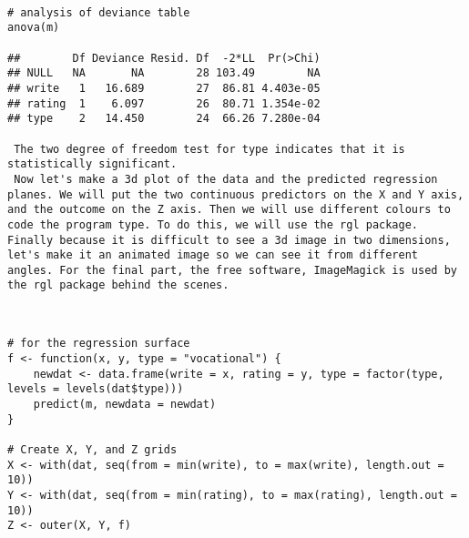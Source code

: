 \begin{frame}[fragile]
	\large
	\begin{framed}
		\begin{verbatim}

# analysis of deviance table
anova(m)

##        Df Deviance Resid. Df  -2*LL  Pr(>Chi)
## NULL   NA       NA        28 103.49        NA
## write   1   16.689        27  86.81 4.403e-05
## rating  1    6.097        26  80.71 1.354e-02
## type    2   14.450        24  66.26 7.280e-04

 The two degree of freedom test for type indicates that it is statistically significant.
 Now let's make a 3d plot of the data and the predicted regression planes. We will put the two continuous predictors on the X and Y axis, and the outcome on the Z axis. Then we will use different colours to code the program type. To do this, we will use the rgl package. Finally because it is difficult to see a 3d image in two dimensions, let's make it an animated image so we can see it from different angles. For the final part, the free software, ImageMagick is used by the rgl package behind the scenes.
 
\end{verbatim}
\end{framed}
\end{frame}
\begin{frame}[fragile]
	\large
	\begin{framed}
		\begin{verbatim}

# for the regression surface
f <- function(x, y, type = "vocational") {
    newdat <- data.frame(write = x, rating = y, type = factor(type, levels = levels(dat$type)))
    predict(m, newdata = newdat)
}

# Create X, Y, and Z grids
X <- with(dat, seq(from = min(write), to = max(write), length.out = 10))
Y <- with(dat, seq(from = min(rating), to = max(rating), length.out = 10))
Z <- outer(X, Y, f)
\end{verbatim}
\end{framed}
\end{frame}
